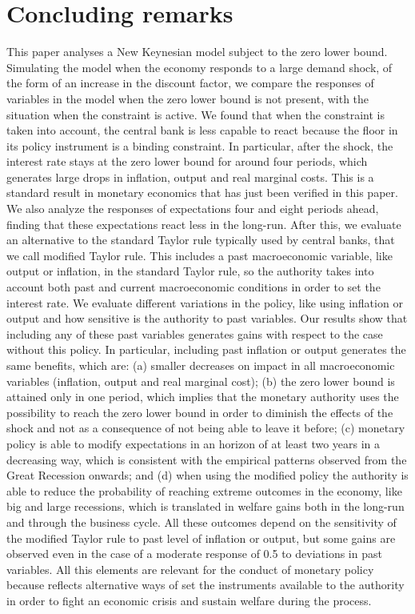 \documentclass[11pt]{article}
\numberwithin{equation}{section}
\begin{document}
\section{Concluding remarks}\label{sec:conclusions}

This paper analyses a New Keynesian model subject to the zero lower bound. Simulating the model when the economy responds to a large demand shock, of the form of an increase in the discount factor, we compare the responses of variables in the model when the zero lower bound is not present, with the situation when the constraint is active. We found that when the constraint is taken into account, the central bank is less capable to react because the floor in its policy instrument is a binding constraint. In particular, after the shock, the interest rate stays at the zero lower bound for around four periods, which generates large drops in inflation, output and real marginal costs. This is a standard result in monetary economics that has just been verified in this paper. We also analyze the responses of expectations four and eight periods ahead, finding that these expectations react less in the long-run. After this, we evaluate an alternative to the standard Taylor rule typically used by central banks, that we call modified Taylor rule. This includes a past macroeconomic variable, like output or inflation, in the standard Taylor rule, so the authority takes into account both past and current macroeconomic conditions in order to set the interest rate. We evaluate different variations in the policy, like using inflation or output and how sensitive is the authority to past variables. Our results show that including any of these past variables generates gains with respect to the case without this policy. In particular, including past inflation or output generates the same benefits, which are: (a) smaller decreases on impact in all macroeconomic variables (inflation, output and real marginal cost); (b) the zero lower bound is attained only in one period, which implies that the monetary authority uses the possibility to reach the zero lower bound in order to diminish the effects of the shock and not as a consequence of not being able to leave it before; (c) monetary policy is able to modify expectations in an horizon of at least two years in a decreasing way, which is consistent with the empirical patterns observed from the Great Recession onwards; and (d) when using the modified policy the authority is able to reduce the probability of reaching extreme outcomes in the economy, like big and large recessions, which is translated in welfare gains both in the long-run and through the business cycle. All these outcomes depend on the sensitivity of the modified Taylor rule to past level of inflation or output, but some gains are observed even in the case of a moderate response of 0.5 to deviations in past variables. All this elements are relevant for the conduct of monetary policy because reflects alternative ways of set the instruments available to the authority in order to fight an economic crisis and sustain welfare during the process.
\end{document}
